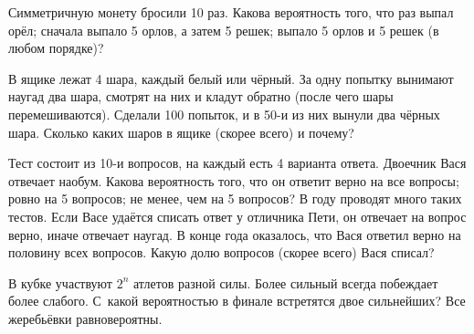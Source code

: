 \documentclass[a4paper,12pt]{article}
\begin{document}


Симметричную монету бросили 10 раз. %
Какова вероятность того, что
раз выпал ор\"ел;
сначала выпало 5 орлов, а затем 5 решек;
выпало 5 орлов и 5 решек (в любом порядке)?

В ящике лежат 4 шара, каждый белый или чёрный.
За одну попытку вынимают наугад два шара,
смотрят на них и кладут обратно (после чего шары перемешиваются).
Сделали 100 попыток, и в 50-и из них вынули два чёрных шара.
Сколько каких шаров в ящике (скорее всего) и почему?

Тест состоит из 10-и вопросов, на каждый есть 4
варианта ответа. Двоечник Вася отвечает %
 наобум.
Какова вероятность того, что он ответит верно 
на все вопросы;
ровно на 5 вопросов;
не менее, чем на 5 вопросов?
 В году проводят много таких тестов. Если Васе уда\"ется списать ответ %
у отличника Пети, он отвечает на вопрос верно, %
иначе отвечает наугад. В конце года оказалось, что Вася
ответил верно на половину всех вопросов.
Какую долю вопросов (скорее всего) Вася списал?






В кубке участвуют $2^n$ атлетов разной силы.
Более сильный всегда побеждает более слабого. %
С~какой вероятностью в финале
встретятся двое сильнейших? Все жеребьёвки равновероятны.
\end{document}

